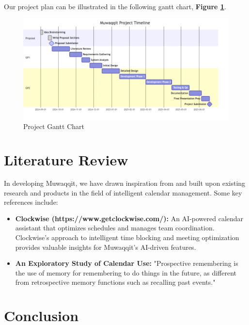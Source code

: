 \documentclass[12pt,a4paper]{article}
\begin{document}
Our project plan can be illustrated in the following gantt chart, \textbf{Figure \ref{fig:project-gantt-chart}}.

\begin{figure}[!h]
    \centering
    \includegraphics[width=\textwidth]{images/gantt.png}
    \caption{Project Gantt Chart}
    \label{fig:project-gantt-chart}
\end{figure}

\section{Literature Review}

In developing Muwaqqit, we have drawn inspiration from and built upon existing research and products in the field of intelligent calendar management. Some key references include:

\begin{itemize}
    \item \textbf{Clockwise (https://www.getclockwise.com/):} An AI-powered calendar assistant that optimizes schedules and manages team coordination. Clockwise's approach to intelligent time blocking and meeting optimization provides valuable insights for Muwaqqit's AI-driven features.
    \item \textbf{An Exploratory Study of Calendar Use:} "Prospective remembering is the use of memory for remembering to do things in the future, as different from retrospective memory functions such as recalling past events."
\end{itemize}

\section{Conclusion}
\end{document}
